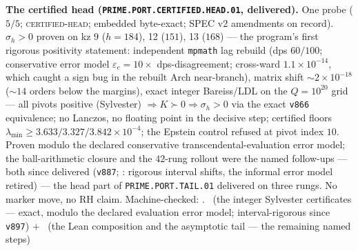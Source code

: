 \par\smallskip\noindent\textbf{The certified head
(\texttt{PRIME.PORT.CERTIFIED.\allowbreak HEAD.01},
delivered).}
One probe ($5/5$; \textsc{certified-head}; embedded byte-exact;
SPEC v2 amendments on record).  $\sigma_h > 0$ proven on kz 9
($h = 184$), 12 ($151$), 13 ($168$) --- the program's first
rigorous positivity statement: independent \texttt{mpmath} lag
rebuild (dps $60/100$; conservative error model $\varepsilon_c =
10\times$ dps-disagreement; cross-ward $1.1\times10^{-14}$,
which caught a sign bug in the rebuilt Arch near-branch), matrix
shift ${\sim}2\times10^{-18}$ (${\sim}14$ orders below the
margins), exact integer Bareiss/LDL on the $Q = 10^{20}$ grid
--- all pivots positive (Sylvester) $\Rightarrow K \succ 0
\Rightarrow \sigma_h > 0$ via the exact \texttt{v866}
equivalence; no Lanczos, no floating point in the decisive step;
certified floors $\lambda_{\min} \ge
3.633/3.327/3.842\times10^{-4}$; the Epstein control refused at
pivot index $10$.  Proven modulo the declared conservative
transcendental-evaluation error model; the ball-arithmetic
closure and the $42$-rung rollout were the named follow-ups ---
both since delivered (\texttt{v887};
: rigorous interval
shifts, the informal error model retired) --- the
head part of \texttt{PRIME.PORT.TAIL.01} delivered on three
rungs.  No marker move, no RH claim.
Machine-checked: .
\mE\ (the integer Sylvester certificates --- exact, modulo the
declared evaluation error model; interval-rigorous since
\texttt{v897}) $+$ \mO\ (the Lean composition and the asymptotic
tail --- the remaining named steps)
\par\smallskip


